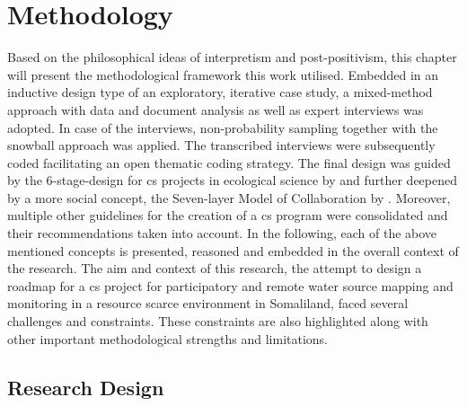 
\chapter{Methodology} %

\label{chap3:methodology} %


Based on the philosophical ideas of interpretism and post-positivism, this chapter will present the methodological framework this work utilised. Embedded in an inductive design type of an exploratory, iterative case study, a mixed-method approach with data and document analysis as well as expert interviews was adopted. In case of the interviews, non-probability sampling together with the snowball approach was applied. The transcribed interviews were subsequently coded facilitating an open thematic coding strategy. The final design was guided by the 6-stage-design for \acrlong*{cs} projects in ecological science by \autocite{fraislCitizenScienceEnvironmental2022} and further deepened by a more social concept, the Seven-layer Model of Collaboration by \autocite{briggsSevenLayerModelCollaboration}. Moreover, multiple other guidelines for the creation of a \acrshort*{cs} program were consolidated and their recommendations taken into account.\newline
In the following, each of the above mentioned concepts is presented, reasoned and embedded in the overall context of the research. The aim and context of this research, the attempt to design a roadmap for a \acrshort*{cs} project for participatory and remote water source mapping and monitoring in a resource scarce environment in Somaliland, faced several challenges and constraints. These constraints are also highlighted along with other important methodological strengths and limitations.

\section*{Research Design} %

